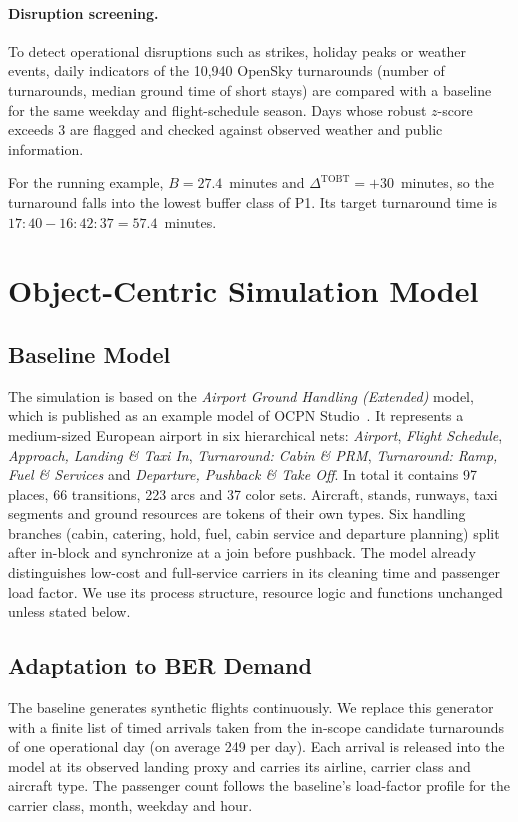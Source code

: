 \paragraph{Disruption screening.}
To detect operational disruptions such as strikes, holiday peaks or weather events, daily indicators of the 10,940 OpenSky turnarounds (number of turnarounds, median ground time of short stays) are compared with a baseline for the same weekday and flight-schedule season. Days whose robust $z$-score exceeds 3 are flagged and checked against observed weather and public information.

For the running example, $B=27.4$~minutes and $\Delta^{\mathrm{TOBT}}=+30$~minutes, so the turnaround falls into the lowest buffer class of P1. Its target turnaround time is $17{:}40-16{:}42{:}37=57.4$~minutes.

\section{Object-Centric Simulation Model}
\label{sec:method-model}

\subsection{Baseline Model}
The simulation is based on the \emph{Airport Ground Handling (Extended)} model, which is published as an example model of OCPN Studio~\cite{ocpn_studio}. It represents a medium-sized European airport in six hierarchical nets: \emph{Airport}, \emph{Flight Schedule}, \emph{Approach, Landing \& Taxi In}, \emph{Turnaround: Cabin \& PRM}, \emph{Turnaround: Ramp, Fuel \& Services} and \emph{Departure, Pushback \& Take Off}. In total it contains 97 places, 66 transitions, 223 arcs and 37 color sets. Aircraft, stands, runways, taxi segments and ground resources are tokens of their own types. Six handling branches (cabin, catering, hold, fuel, cabin service and departure planning) split after in-block and synchronize at a join before pushback. The model already distinguishes low-cost and full-service carriers in its cleaning time and passenger load factor. We use its process structure, resource logic and functions unchanged unless stated below.

\subsection{Adaptation to BER Demand}
The baseline generates synthetic flights continuously. We replace this generator with a finite list of timed arrivals taken from the in-scope candidate turnarounds of one operational day (on average 249 per day). Each arrival is released into the model at its observed landing proxy and carries its airline, carrier class and aircraft type. The passenger count follows the baseline's load-factor profile for the carrier class, month, weekday and hour.

